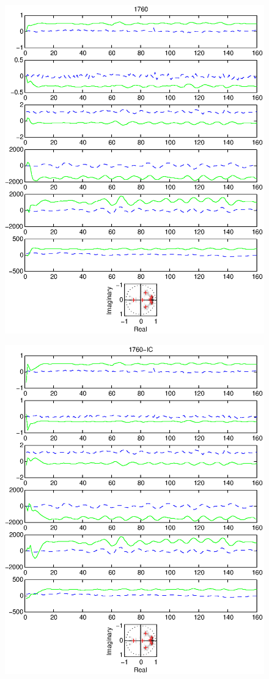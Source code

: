 \documentclass{article}
\begin{document}
\begin{figure}[htb!]
\centering
\includegraphics{1760.eps}
\end{figure}\clearpage
\begin{figure}[htb!]
\centering
\includegraphics{1760_ic.eps}
\end{figure}\clearpage
\end{document}
